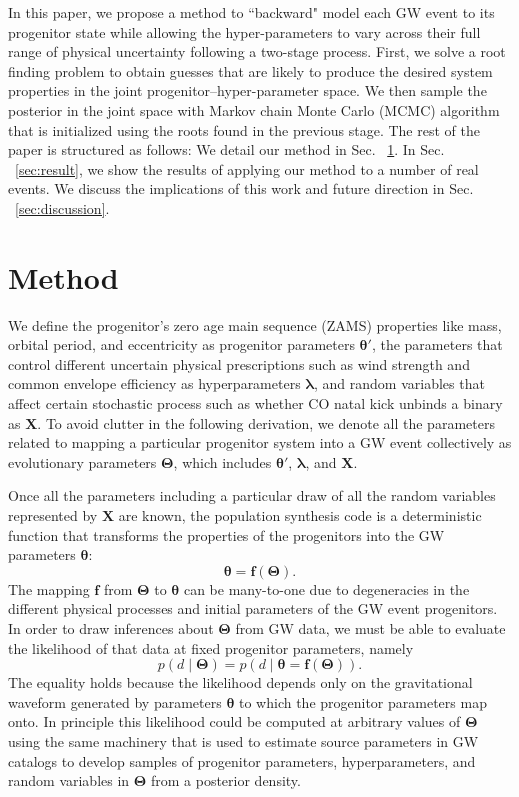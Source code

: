 \documentclass[twocolumn]{aastex631}
\begin{document}
In this paper, we propose a method to ``backward" model each GW event to its progenitor state 
while allowing the hyper-parameters to vary across their full range of physical uncertainty
following a two-stage process.
First, we solve a root finding problem to obtain guesses that are likely to produce the desired system properties in the joint progenitor--hyper-parameter space.
We then sample the posterior in the joint space with Markov chain Monte Carlo (MCMC) algorithm that is initialized using the roots found in the previous stage.
The rest of the paper is structured as follows: We detail our method in Sec. ~\ref{sec:method}.
In Sec. ~\ref{sec:result}, we show the results of applying our method to a number of real events.
We discuss the implications of this work and future direction in Sec. ~\ref{sec:discussion}.

\section{Method}
\label{sec:method}


We define the progenitor's zero age main sequence (ZAMS) properties like
mass, orbital period, and eccentricity as progenitor parameters $\bm{\theta'}$, the parameters
that control different uncertain physical prescriptions such as wind strength and common
envelope efficiency as hyperparameters $\bm{\lambda}$, and random variables
that affect certain stochastic process such as whether CO natal kick unbinds a
binary as $\bm{X}$. To avoid clutter in the following derivation, we denote all
the parameters related to mapping a particular progenitor system into a GW event
collectively as evolutionary parameters $\bm{\Theta}$, which includes
$\bm{\theta'}$, $\bm{\lambda}$, and $\bm{X}$.

Once all the parameters including a particular draw of all the random variables
represented by $\bm{X}$ are known, the population synthesis code is a
deterministic function that transforms the properties of the progenitors into
the GW parameters $\bm{\theta}$:
\begin{equation}
    \bm{\theta} = \bm{f}\left( \bm{\Theta} \right).
\end{equation}
The mapping $\bm{f}$ from $\bm{\Theta}$ to $\bm{\theta}$ can be many-to-one
due to degeneracies in the different physical processes and initial parameters  
of the GW event progenitors.
In order to draw inferences about $\bm{\Theta}$ from GW data, we
must be able to evaluate the likelihood of that data at fixed progenitor
parameters, namely
\begin{equation}
    p\left( d \mid \bm{\Theta} \right) = p\left( d \mid \bm{\theta} = \bm{f}\left( \bm{\Theta} \right) \right).
\end{equation}
The equality holds because the likelihood depends only on the gravitational waveform generated by
parameters $\bm{\theta}$ to which the progenitor parameters map onto.  In principle
this likelihood could be computed at arbitrary values of $\bm{\Theta}$ using the
same machinery that is used to estimate source parameters in GW
catalogs \citep{Veitch2015,Ashton2019,Romero-Shaw2020,GWTC-3} to develop samples
of progenitor parameters, hyperparameters, and random variables in
$\bm{\Theta}$ from a posterior density.
\end{document}
